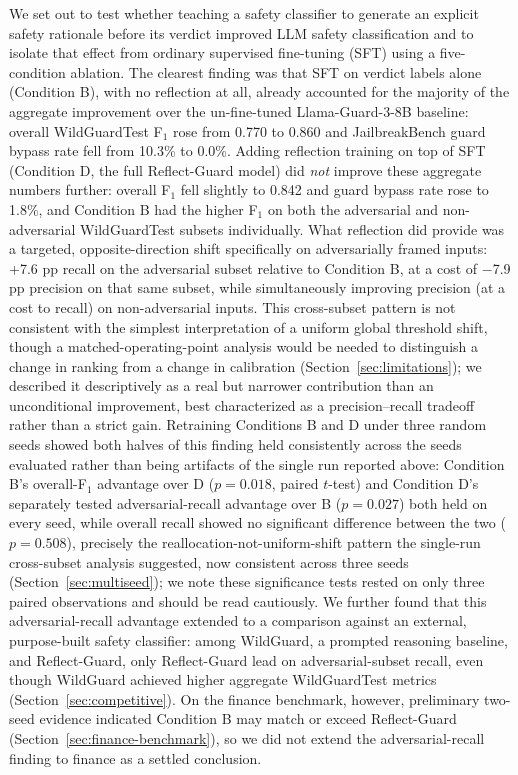 \documentclass[superintelligence,article,accept,moreauthors]{Definitions/mdpi}
\begin{document}
We set out to test whether teaching a safety classifier to generate an explicit safety rationale before its verdict improved LLM safety classification and to isolate that effect from ordinary supervised fine-tuning (SFT) using a five-condition ablation. The clearest finding was that SFT on verdict labels alone (Condition B), with no reflection at all, already accounted for the majority of the aggregate improvement over the un-fine-tuned Llama-Guard-3-8B baseline: overall WildGuardTest F$_1$ rose from 0.770 to 0.860 and JailbreakBench guard bypass rate fell from 10.3\% to 0.0\%. Adding reflection training on top of SFT (Condition D, the full Reflect-Guard model) did \emph{not} improve these aggregate numbers further: overall F$_1$ fell slightly to 0.842 and guard bypass rate rose to 1.8\%, and Condition B had the higher F$_1$ on both the adversarial and non-adversarial WildGuardTest subsets individually. What reflection did provide was a targeted, opposite-direction shift specifically on adversarially framed inputs: +7.6 pp recall on the adversarial subset relative to Condition B, at a cost of $-$7.9 pp precision on that same subset, while simultaneously improving precision (at a cost to recall) on non-adversarial inputs. This cross-subset pattern is not consistent with the simplest interpretation of a uniform global threshold shift, though a matched-operating-point analysis would be needed to distinguish a change in ranking from a change in calibration (Section~\ref{sec:limitations}); we described it descriptively as a real but narrower contribution than an unconditional improvement, best characterized as a precision--recall tradeoff rather than a strict gain. Retraining Conditions B and D under three random seeds showed both halves of this finding held consistently across the seeds evaluated rather than being artifacts of the single run reported above: Condition B's overall-F$_1$ advantage over D ($p=0.018$, paired $t$-test) and Condition D's separately tested adversarial-recall advantage over B \mbox{($p=0.027$)} both held on every seed, while overall recall showed no significant difference between the two ($p=0.508$), precisely the reallocation-not-uniform-shift pattern the single-run cross-subset analysis suggested, now consistent across three seeds (Section~\ref{sec:multiseed}); we note these significance tests rested on only three paired observations and should be read cautiously. We further found that this adversarial-recall advantage extended to a comparison against an external, purpose-built safety classifier: among WildGuard, a prompted reasoning baseline, and Reflect-Guard, only Reflect-Guard lead on adversarial-subset recall, even though WildGuard achieved higher aggregate WildGuardTest metrics (Section~\ref{sec:competitive}). On the finance benchmark, however, preliminary two-seed evidence indicated Condition B may match or exceed Reflect-Guard (Section~\ref{sec:finance-benchmark}), so we did not extend the adversarial-recall finding to finance as a settled conclusion.
\end{document}
